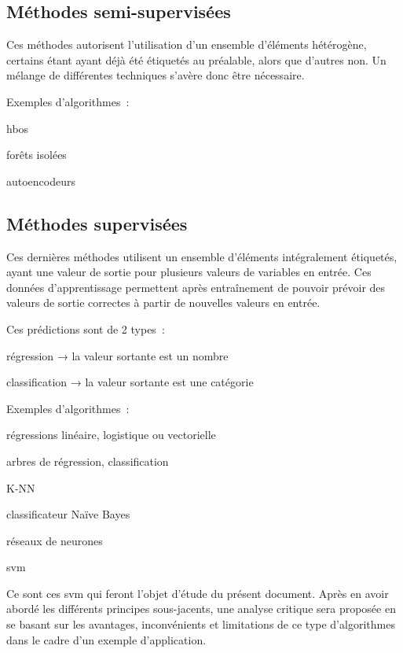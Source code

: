 \subsection{Méthodes semi-supervisées}

Ces méthodes autorisent l’utilisation d’un ensemble d’éléments hétérogène,
certains étant ayant déjà été étiquetés au préalable, alors que d’autres non.
Un mélange de différentes techniques s’avère donc être nécessaire.

Exemples d’algorithmes :
\begin{itmz}
\item{\gls{hbos}}
\item{forêts isolées}
\item{autoencodeurs}
\end{itmz}

\subsection{Méthodes supervisées}

Ces dernières méthodes utilisent un ensemble d’éléments intégralement étiquetés,
ayant une valeur de sortie pour plusieurs valeurs de variables en entrée.
Ces données d’apprentissage permettent après entraînement de pouvoir
prévoir des valeurs de sortie correctes à partir de nouvelles valeurs en entrée.

Ces prédictions sont de 2 types :
\begin{itmz}
\item{régression → la valeur sortante est un nombre}
\item{classification → la valeur sortante est une catégorie}
\end{itmz}

Exemples d’algorithmes :
\begin{itmz}
\item{régressions linéaire, logistique ou vectorielle}
\item{arbres de régression, classification}
\item{K-NN}
\item{classificateur Naïve Bayes}
\item{réseaux de neurones}
\item{\gls{svm}}
\end{itmz}

Ce sont ces \gls{svm} qui feront l’objet d’étude du présent document.
Après en avoir abordé les différents principes sous-jacents,
une analyse critique sera proposée en se basant sur les avantages,
inconvénients et limitations de ce type d’algorithmes
dans le cadre d’un exemple d’application.

\pagebreak
